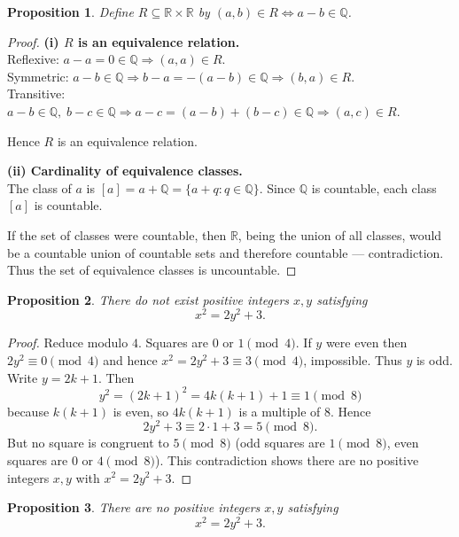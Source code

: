 \documentclass{article}
\theoremstyle{plain}
\newtheorem{proposition}{Proposition}
\theoremstyle{definition}
\theoremstyle{remark}
\begin{document}
\begin{proposition}
    Define \(R\subseteq\mathbb{R}\times\mathbb{R}\) by
\((a,b)\in R \iff a-b\in\mathbb{Q}\).
\end{proposition}
\begin{proof}
    


\textbf{(i) $R$ is an equivalence relation.} \\
Reflexive: \(a-a=0\in\mathbb{Q}\Rightarrow (a,a)\in R\).\\
Symmetric: \(a-b\in\mathbb{Q}\Rightarrow b-a=-(a-b)\in\mathbb{Q}\Rightarrow (b,a)\in R\).\\
Transitive: \(a-b\in\mathbb{Q},\; b-c\in\mathbb{Q}\Rightarrow a-c=(a-b)+(b-c)\in\mathbb{Q}\Rightarrow (a,c)\in R\).

Hence \(R\) is an equivalence relation.

\medskip
\textbf{(ii) Cardinality of equivalence classes.} \\
The class of \(a\) is \( [a]=a+\mathbb{Q}=\{a+q:q\in\mathbb{Q}\}\). Since \(\mathbb{Q}\) is countable, each class \([a]\) is countable.

If the set of classes were countable, then \(\mathbb{R}\), being the union of all classes, would be a countable union of countable sets and therefore countable — contradiction. Thus the set of equivalence classes is uncountable.

\end{proof}

\begin{proposition}
There do not exist positive integers \(x,y\) satisfying
\[
x^{2}=2y^{2}+3.
\]
\end{proposition}

\begin{proof}
Reduce modulo \(4\). Squares are \(0\) or \(1\pmod4\). If \(y\) were even then
\(2y^{2}\equiv0\pmod4\) and hence \(x^{2}=2y^{2}+3\equiv3\pmod4\), impossible.
Thus \(y\) is odd. Write \(y=2k+1\). Then
\[
y^{2}=(2k+1)^{2}=4k(k+1)+1\equiv1\pmod8
\]
because \(k(k+1)\) is even, so \(4k(k+1)\) is a multiple of \(8\). Hence
\[
2y^{2}+3\equiv 2\cdot1+3=5\pmod8.
\]
But no square is congruent to \(5\pmod8\) (odd squares are \(1\pmod8\), even
squares are \(0\) or \(4\pmod8\)). This contradiction shows there are no
positive integers \(x,y\) with \(x^{2}=2y^{2}+3\).
\end{proof}
\begin{proposition}
There are no positive integers \(x,y\) satisfying
\[
x^2 = 2y^2 + 3.
\]
\end{proposition}
\end{document}
